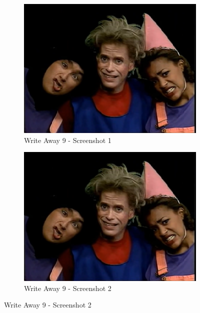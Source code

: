 \begin{figure}[H]
    \centering
    \begin{subfigure}{0.45\textwidth}
        \centering
        \includegraphics[width=\linewidth]{Games/WriteAway/Images/WriteAway9Screenshot1.png}
        \caption{Write Away 9 - Screenshot 1}
    \end{subfigure}
    \begin{subfigure}{0.45\textwidth}
        \centering
        \includegraphics[width=\linewidth]{Games/WriteAway/Images/WriteAway9Screenshot1.png}
        \caption{Write Away 9 - Screenshot 2}
    \end{subfigure}


\end{figure}
